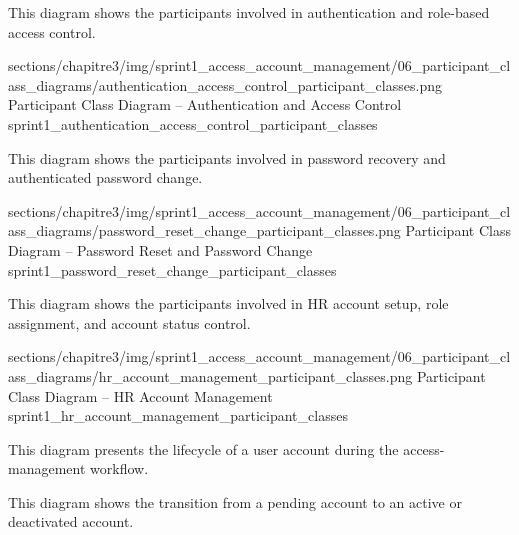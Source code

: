 \Needspace{9cm}

\noindent This diagram shows the participants involved in authentication and role-based access control.\par

\ChapterThreeFigure
{sections/chapitre3/img/sprint1_access_account_management/06_participant_class_diagrams/authentication_access_control_participant_classes.png}
{Participant Class Diagram – Authentication and Access Control}
{sprint1_authentication_access_control_participant_classes}

\Needspace{7.2cm}

\noindent This diagram shows the participants involved in password recovery and authenticated password change.\par

\ChapterThreeFigure
{sections/chapitre3/img/sprint1_access_account_management/06_participant_class_diagrams/password_reset_change_participant_classes.png}
{Participant Class Diagram – Password Reset and Password Change}
{sprint1_password_reset_change_participant_classes}

\Needspace{7.2cm}

\noindent This diagram shows the participants involved in HR account setup, role assignment, and account status control.\par

\ChapterThreeFigure
{sections/chapitre3/img/sprint1_access_account_management/06_participant_class_diagrams/hr_account_management_participant_classes.png}
{Participant Class Diagram – HR Account Management}
{sprint1_hr_account_management_participant_classes}


{\fontsize{12}{18}\selectfont
\setlength{\parindent}{1.2cm}
\setlength{\parskip}{6pt}

\indent This diagram presents the lifecycle of a user account during the access-management workflow.
}

\Needspace{8.5cm}

\noindent This diagram shows the transition from a pending account to an active or deactivated account.\par

